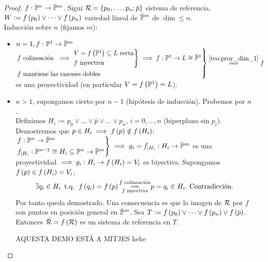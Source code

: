\begin{proof}
    $f : \mathbb{P}^n \to \bar{\mathbb{P}}^m$. Sigui $\mathcal{R} = \{ p_0, \dots, p_n; \bar{p} \}$ sistema de referencia, $W := f \left( p_0 \right) \vee \dots \vee f \left( p_n \right)$ variedad lineal de $\bar{\mathbb{P}}^m$ de $\dim \leq n$. \\
    Inducción sobre $n$ (fijamos $m$):
    \begin{itemize}
        \item $n = 1, f : \mathbb{P}^1 \to \bar{\mathbb{P}}^m$ \\
        $\begin{rcases}
            f \text{ colineación } \implies 
            \begin{rcases}
                V = f \left( \mathbb{P}^1 \right) \subseteq L \text{ recta} \\
                f \text{ inyectiva}
            \end{rcases}
            \implies f : \mathbb{P}^1 \to L \cong \bar{\mathbb{P}}^1 \\
            f \text{ mantiene las razones dobles}
        \end{rcases}
        \stackrel{\ref{teo:proy_dim_1}}{\implies} f$ es una proyectividad (en particular $V = f \left( \mathbb{P}^1 \right) = L$).
        \item $n > 1$, supongamos cierto por $n-1$ (hipótesis de inducción). Probemos por $n$. \\
        Definimos $H_i := p_0 \vee \dots \vee \hat{p} \vee \dots \vee p_n$, $i = 0, \dots, n$ (hiperplano sin $p_i$). Demostremos que $p \in H_i \implies f \left( p \right) \notin f \left( H_i \right)$: \\
        $\begin{rcases}
            f : \mathbb{P}^n \to \bar{\mathbb{P}}^m \\
            f_{|H_i} : \mathbb{P}^{n-1} \cong H_i \subseteq \mathbb{P}^n \to \bar{\mathbb{P}}^m
        \end{rcases}
        \implies g_i = f_{|H_i} : H_i \to \bar{\mathbb{P}}^m$ es una proyectividad $\implies g_i : H_i \to f \left( H_i \right) = V_i$ es biyectiva. Supongamos $f \left( p \right) \in f \left( H_i \right) = V_i$,
        \[
            \exists q_i \in H_i \operatorname{\text{ t.q. }} f \left( q_i \right) = f \left( p \right) \substack{f \text{ colineación} \\ \implies \\ f \text{ inyectiva}} p = q_i \in H_i. \text{ Contradicción.}
        \]
        Por tanto queda demostrado. Una consecuencia es que la imagen de $\mathcal{R}$ por $f$ son puntos en posición general en $\bar{\mathbb{P}}^m$. Sea $T := f \left( p_0 \right) \vee \dots \vee f \left( p_n \right) \vee f \left( \bar{p} \right)$. Entonces $\bar{\mathcal{R}} = f \left( \mathcal{R} \right)$ es un sistema de referencia en $T$.
        
        AQUESTA DEMO ESTÁ A MITJES hehe
    \end{itemize}
\end{proof}
